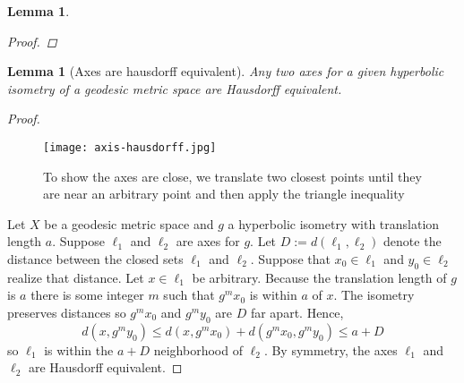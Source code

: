 \documentclass[12pt,parskip=full]{report}
\theoremstyle{plain}
\newtheorem{lem}[thm]{Lemma}
\theoremstyle{definition}
\begin{document}
\begin{lem}
\begin{proof}
    

    \end{proof}
\end{lem}

\begin{lem}
    [Axes are hausdorff equivalent]
    \label{lem:axeshausdorff}
    Any two axes for a given hyperbolic isometry of a geodesic metric space are Hausdorff equivalent.
\end{lem}
\begin{proof}

\begin{figure}[htp]
    \centering
    \texttt{[image: axis-hausdorff.jpg]}
    \caption{To show the axes are close, we translate two closest points until they are near an arbitrary point and then apply the triangle inequality}
    \label{fig:axis-hausdorff}
\end{figure}

    Let $X$ be a geodesic metric space and $g$ a hyperbolic isometry with translation length $a$. Suppose $\ell_1$ and $\ell_2$ are axes for $g$. Let $D:= d(\ell_1,\ell_2)$ denote the distance between the closed sets $\ell_1$ and $\ell_2$. Suppose that $x_0\in\ell_1$ and $y_0\in\ell_2$ realize that distance. Let $x\in\ell_1$ be arbitrary. Because the translation length of $g$ is $a$ there is some integer $m$ such that $g^mx_0$ is within $a$ of $x$. The isometry preserves distances so $g^mx_0$ and $g^my_0$ are $D$ far apart. Hence, $$d(x, g^my_0)\leq d(x, g^mx_0) + d(g^mx_0, g^my_0)\leq a+D$$ so $\ell_1$ is within the $a+D$ neighborhood of $\ell_2$. By symmetry, the axes $\ell_1$ and $\ell_2$ are Hausdorff equivalent.
\end{proof}
\end{document}
